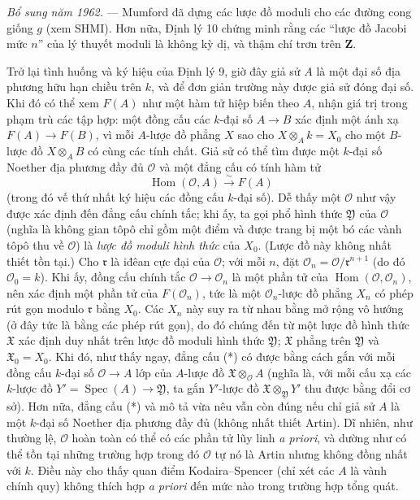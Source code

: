 \documentclass[11pt,twoside,openany]{book}
\numberwithin{equation}{section}
\newcommand{\src}[1]{%
  \phantomsection\hypertarget{src:\fgasourceid:#1}{}%
  \marginpar{\raggedleft\footnotesize\sffamily #1}%
}
\newcommand{\fgasourceid}{unset}
\begin{document}
\emph{Bổ sung năm 1962.} --- Mumford đã dựng các lược đồ moduli cho các đường
cong giống $g$ (xem SHMI). Hơn nữa, Định lý 10 chứng minh rằng các “lược đồ
Jacobi mức $n$” của lý thuyết moduli là không kỳ dị, và thậm chí trơn trên
$\mathbf Z$.

\src{208}
Trở lại tình huống và ký hiệu của Định lý 9, giờ đây giả sử $A$ là một đại số
địa phương hữu hạn chiều trên $k$, và để đơn giản trường này được giả sử đóng đại số.
Khi đó có thể xem $F(A)$ như một hàm tử hiệp biến theo $A$, nhận giá trị trong
phạm trù các tập hợp: một đồng cấu các $k$-đại số $A\longrightarrow B$ xác
định một ánh xạ $F(A)\longrightarrow F(B)$, vì mỗi $A$-lược đồ phẳng $X$ sao
cho $X\otimes_A k=X_0$ cho một $B$-lược đồ $X\otimes_A B$ có cùng các tính
chất. Giả sử có thể tìm được một $k$-đại số Noether địa phương đầy đủ
$\mathcal O$ và một đẳng cấu có tính hàm tử
\begin{equation}
  \tag{*}
  \operatorname{Hom}(\mathcal O,A)\xrightarrow{\sim}F(A)
\end{equation}
(trong đó vế thứ nhất ký hiệu các đồng cấu $k$-đại số). Dễ thấy một
$\mathcal O$ như vậy được xác định đến đẳng cấu chính tắc; khi ấy, ta gọi phổ
hình thức $\mathfrak Y$ của $\mathcal O$ (nghĩa là không gian tôpô chỉ gồm
một điểm và được trang bị một bó các vành tôpô thu về $\mathcal O$) là
\emph{lược đồ moduli hình thức} của $X_0$. (Lược đồ này không nhất thiết tồn
tại.) Cho $\mathfrak r$ là iđêan cực đại của $\mathcal O$; với mỗi $n$, đặt
$\mathcal O_n=\mathcal O/\mathfrak r^{n+1}$ (do đó $\mathcal O_0=k$). Khi
ấy, đồng cấu chính tắc $\mathcal O\longrightarrow\mathcal O_n$ là một phần tử
của $\operatorname{Hom}(\mathcal O,\mathcal O_n)$, nên xác định một phần tử
của $F(\mathcal O_n)$, tức là một $\mathcal O_n$-lược đồ phẳng $X_n$ có phép
rút gọn modulo $\mathfrak r$ bằng $X_0$. Các $X_n$ này suy ra từ nhau bằng
mở rộng vô hướng (ở đây tức là bằng các phép rút gọn), do đó chúng đến từ một
lược đồ hình thức $\mathfrak X$ xác định duy nhất trên lược đồ moduli hình
thức $\mathfrak Y$; $\mathfrak X$ phẳng trên $\mathfrak Y$ và
$\mathfrak X_0=X_0$. Khi đó, như thấy ngay, đẳng cấu (*) có được bằng cách
gắn với mỗi đồng cấu $k$-đại số $\mathcal O\longrightarrow A$ lớp của
$A$-lược đồ $\mathfrak X\otimes_{\mathcal O}A$ (nghĩa là, với mỗi cấu xạ các
$k$-lược đồ $Y'=\operatorname{Spec}(A)\longrightarrow\mathfrak Y$, ta gắn
$Y'$-lược đồ $\mathfrak X\otimes_{\mathfrak Y}Y'$ thu được bằng đổi cơ sở).
Hơn nữa, đẳng cấu (*) và mô tả vừa nêu vẫn còn đúng nếu chỉ giả sử $A$ là một
$k$-đại số Noether địa phương đầy đủ (không nhất thiết Artin). Dĩ nhiên, như
thường lệ, $\mathcal O$ hoàn toàn có thể có các phần tử lũy linh
\textit{a priori}, và dường như có thể tồn tại những trường hợp trong đó
$\mathcal O$ tự nó là Artin nhưng không đồng nhất với $k$. Điều này cho thấy
quan điểm Kodaira--Spencer (chỉ xét các $A$ là vành chính quy) không thích hợp
\textit{a priori} đến mức nào trong trường hợp tổng quát.
\end{document}
